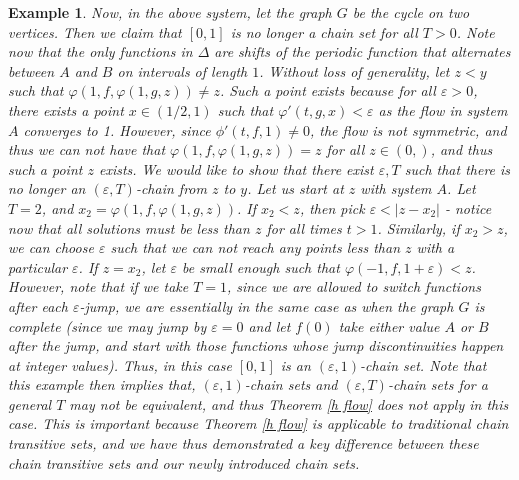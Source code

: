 \documentclass[11pt]{article}
\newtheorem{ex}[thm]{Example}
\begin{document}
\begin{ex}
\indent Now, in the above system, let the graph $G$ be the cycle on two vertices.  Then we claim that $[0,1]$ is no longer a chain set for all $T>0$.  Note now that the only functions in $\Delta$ are shifts of the periodic function that alternates between $A$ and $B$ on intervals of length $1$.  Without loss of generality, let $z<y$ such that $\varphi(1,f,\varphi(1,g,z))\not=z$.  Such a point exists because for all $\varepsilon>0$, there exists a point $x\in(1/2,1)$ such that $\varphi'(t,g,x )<\varepsilon$ as the flow in system $A$ converges to 1.  However, since $\phi'(t,f,1)\not=0$, the flow is not symmetric, and thus we can not have that $\varphi(1,f,\varphi(1,g,z))=z$ for all $z\in(0,)$, and thus such a point $z$ exists.  We would like to show that there exist $\varepsilon,T$ such that there is no longer an $(\varepsilon,T)$-chain from $z$ to $y$.  Let us start at $z$ with system $A$.  Let $T=2$, and $x_{2}=\varphi(1,f,\varphi(1,g,z))$.  If $x_{2}<z$, then pick $\varepsilon<|z-x_{2}|$ - notice now that all solutions must be less than $z$ for all times $t>1$.  Similarly, if $x_{2}>z$, we can choose $\varepsilon$ such that we can not reach any points less than $z$ with a particular $\varepsilon$. If $z=x_{2}$, let $\varepsilon$ be small enough such that $\varphi(-1,f,1+\varepsilon)<z$. \\
\indent However, note that if we take $T=1$, since we are allowed to switch functions after each $\varepsilon$-jump, we are essentially in the same case as when the graph $G$ is complete (since we may jump by $\varepsilon=0$ and let $f(0)$ take either value $A$ or $B$ after the jump, and start with those functions whose jump discontinuities happen at integer values). Thus, in this case $[0,1]$ is an $(\varepsilon,1)$-chain set.  Note that this example then implies that, $(\varepsilon,1)$-chain sets and $(\varepsilon,T)$-chain sets for a general $T$ may not be equivalent, and thus Theorem \ref{h flow} does not apply in this case.  This is important because Theorem \ref{h flow} is applicable to traditional chain transitive sets, and we have thus demonstrated a key difference between these chain transitive sets and our newly introduced chain sets.
\end{ex}
\end{document}
